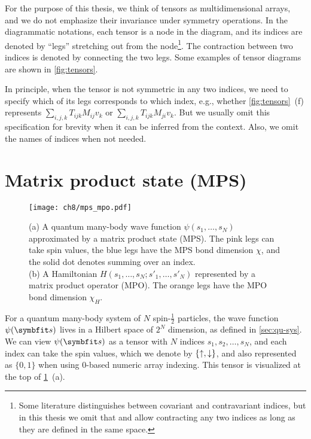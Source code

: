 For the purpose of this thesis, we think of tensors as multidimensional arrays, and we do not emphasize their invariance under symmetry operations. In the diagrammatic notations, each tensor is a node in the diagram, and its indices are denoted by ``legs'' stretching out from the node\footnote{Some literature distinguishes between covariant and contravariant indices, but in this thesis we omit that and allow contracting any two indices as long as they are defined in the same space.}. The contraction between two indices is denoted by connecting the two legs. Some examples of tensor diagrams are shown in \cref{fig:tensors}.

In principle, when the tensor is not symmetric in any two indices, we need to specify which of its legs corresponds to which index, e.g., whether \cref{fig:tensors}~(f) represents $\sum_{i, j, k} T_{i j k} M_{i j} v_k$ or $\sum_{i, j, k} T_{i j k} M_{j i} v_k$. But we usually omit this specification for brevity when it can be inferred from the context. Also, we omit the names of indices when not needed.

\section{Matrix product state (MPS)}

\begin{figure}[htb]
\centering
\texttt{[image: ch8/mps\_mpo.pdf]}
\caption[Matrix product state (MPS) and matrix product operator (MPO)]{
(a) A quantum many-body wave function $\psi(s_1, \ldots, s_N)$ approximated by a matrix product state (MPS).
The {\color[HTML]{e377c2} pink} legs can take spin values, the {\color[HTML]{1f77b4} blue} legs have the MPS bond dimension $\chi$, and the solid dot denotes summing over an index. \\
(b) A Hamiltonian $H(s_1, \ldots, s_N; s'_1, \ldots, s'_N)$ represented by a matrix product operator (MPO).
The {\color[HTML]{ff7f0e} orange} legs have the MPO bond dimension $\chi_H$.
}
\label{fig:mps-mpo}
\end{figure}

For a quantum many-body system of $N$ spin-$\frac{1}{2}$ particles, the wave function $\psi(\vs)$ lives in a Hilbert space of $2^N$ dimension, as defined in \cref{sec:qu-sys}. We can view $\psi(\vs)$ as a tensor with $N$ indices $s_1, s_2, \ldots, s_N$, and each index can take the spin values, which we denote by $\{{\uparrow}, {\downarrow}\}$, and also represented as $\{0, 1\}$ when using $0$-based numeric array indexing. This tensor is visualized at the top of \cref{fig:mps-mpo}~(a).

